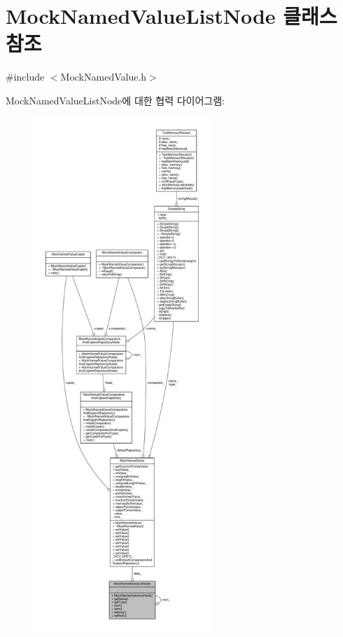 \hypertarget{class_mock_named_value_list_node}{}\section{Mock\+Named\+Value\+List\+Node 클래스 참조}
\label{class_mock_named_value_list_node}


{\ttfamily \#include $<$Mock\+Named\+Value.\+h$>$}



Mock\+Named\+Value\+List\+Node에 대한 협력 다이어그램\+:
\nopagebreak
\begin{figure}[H]
\begin{center}
\leavevmode
\includegraphics[height=550pt]{class_mock_named_value_list_node__coll__graph}
\end{center}
\end{figure}
